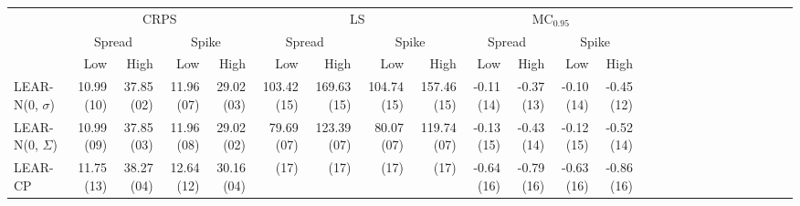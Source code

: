 \begin{tabular}{lrrrrrrrrrrrrrrrrrrrrrrrr}
\toprule
 & \multicolumn{4}{c}{CRPS} & \multicolumn{4}{c}{LS} & \multicolumn{4}{c}{$\text{MC}_{0.95}$} \\
 & \multicolumn{2}{c}{Spread} & \multicolumn{2}{c}{Spike} & \multicolumn{2}{c}{Spread} & \multicolumn{2}{c}{Spike} & \multicolumn{2}{c}{Spread} & \multicolumn{2}{c}{Spike} \\
 & Low & High & Low & High & Low & High & Low & High & Low & High & Low & High \\
\midrule
LEAR-N(0, $\sigma$) & {\cellcolor[HTML]{C2DDEC}} \color[HTML]{000000} 10.99 (10) & {\cellcolor[HTML]{1D5FA2}} \color[HTML]{F1F1F1} 37.85 (02) & {\cellcolor[HTML]{7BB6D6}} \color[HTML]{000000} 11.96 (07) & {\cellcolor[HTML]{185493}} \color[HTML]{F1F1F1} 29.02 (03) & {\cellcolor[HTML]{67001F}} \color[HTML]{F1F1F1} 103.42 (15) & {\cellcolor[HTML]{67001F}} \color[HTML]{F1F1F1} 169.63 (15) & {\cellcolor[HTML]{67001F}} \color[HTML]{F1F1F1} 104.74 (15) & {\cellcolor[HTML]{67001F}} \color[HTML]{F1F1F1} 157.46 (15) & {\cellcolor[HTML]{3885BC}} \color[HTML]{F1F1F1} -0.11 (14) & {\cellcolor[HTML]{E4EEF4}} \color[HTML]{000000} -0.37 (13) & {\cellcolor[HTML]{337EB8}} \color[HTML]{F1F1F1} -0.10 (14) & {\cellcolor[HTML]{E7F0F4}} \color[HTML]{000000} -0.45 (12) \\
LEAR-N(0, $\Sigma$) & {\cellcolor[HTML]{C2DDEC}} \color[HTML]{000000} 10.99 (09) & {\cellcolor[HTML]{1D5FA2}} \color[HTML]{F1F1F1} 37.85 (03) & {\cellcolor[HTML]{7BB6D6}} \color[HTML]{000000} 11.96 (08) & {\cellcolor[HTML]{185493}} \color[HTML]{F1F1F1} 29.02 (02) & {\cellcolor[HTML]{9BC9E0}} \color[HTML]{000000} 79.69 (07) & {\cellcolor[HTML]{6EAED2}} \color[HTML]{F1F1F1} 123.39 (07) & {\cellcolor[HTML]{87BEDA}} \color[HTML]{000000} 80.07 (07) & {\cellcolor[HTML]{D4E6F1}} \color[HTML]{000000} 119.74 (07) & {\cellcolor[HTML]{4695C4}} \color[HTML]{F1F1F1} -0.13 (15) & {\cellcolor[HTML]{F9EDE5}} \color[HTML]{000000} -0.43 (14) & {\cellcolor[HTML]{3F8EC0}} \color[HTML]{F1F1F1} -0.12 (15) & {\cellcolor[HTML]{F9EBE3}} \color[HTML]{000000} -0.52 (14) \\
LEAR-CP & {\cellcolor[HTML]{FCD3BC}} \color[HTML]{000000} 11.75 (13) & {\cellcolor[HTML]{2065AB}} \color[HTML]{F1F1F1} 38.27 (04) & {\cellcolor[HTML]{E4EEF4}} \color[HTML]{000000} 12.64 (12) & {\cellcolor[HTML]{246AAE}} \color[HTML]{F1F1F1} 30.16 (04) & {\cellcolor[HTML]{FFFFFF}} \color[HTML]{000000}  (17) & {\cellcolor[HTML]{FFFFFF}} \color[HTML]{000000}  (17) & {\cellcolor[HTML]{FFFFFF}} \color[HTML]{000000}  (17) & {\cellcolor[HTML]{FFFFFF}} \color[HTML]{000000}  (17) & {\cellcolor[HTML]{67001F}} \color[HTML]{F1F1F1} -0.64 (16) & {\cellcolor[HTML]{67001F}} \color[HTML]{F1F1F1} -0.79 (16) & {\cellcolor[HTML]{67001F}} \color[HTML]{F1F1F1} -0.63 (16) & {\cellcolor[HTML]{67001F}} \color[HTML]{F1F1F1} -0.86 (16) \\

\end{tabular}
